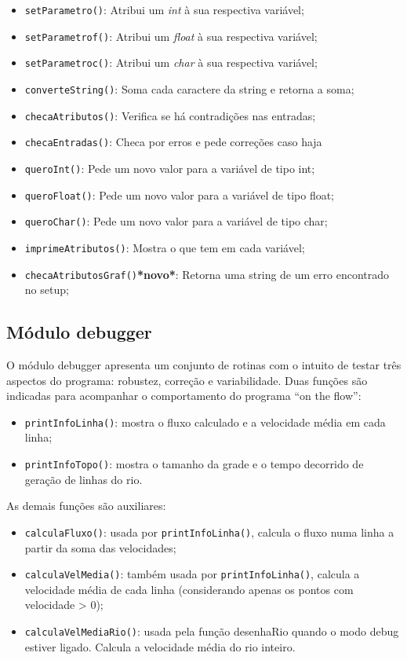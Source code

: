 \documentclass[11pt,a4paper]{article}
\begin{document}
\begin{itemize}
\item \verb|setParametro()|: Atribui um \textit{int} à sua respectiva variável;
\item \verb|setParametrof()|: Atribui um \textit{float} à sua respectiva variável;
\item \verb|setParametroc()|: Atribui um \textit{char} à sua respectiva variável;
\item \verb|converteString()|: Soma cada caractere da string e retorna a soma;
\item \verb|checaAtributos()|: Verifica se há contradições nas entradas;
\item \verb|checaEntradas()|: Checa por erros e pede correções caso haja
\item \verb|queroInt()|: Pede um novo valor para a variável de tipo int;
\item \verb|queroFloat()|: Pede um novo valor para a variável de tipo float;
\item \verb|queroChar()|: Pede um novo valor para a variável de tipo char;
\item \verb|imprimeAtributos()|: Mostra o que tem em cada variável;
\item \verb|checaAtributosGraf()|\textbf{*novo*}: Retorna uma string de um erro encontrado no setup;
\end{itemize}

\subsection{Módulo debugger}
O módulo debugger apresenta um conjunto de rotinas com o intuito de testar três aspectos do programa: robustez, correção e variabilidade. Duas funções são indicadas para acompanhar o comportamento do programa “on the flow”:

\begin{itemize}
\item \verb|printInfoLinha()|: mostra o fluxo calculado e a velocidade média em cada linha;
\item \verb|printInfoTopo()|: mostra o tamanho da grade e o tempo decorrido de geração de linhas do rio.
\end{itemize}

As demais funções são auxiliares:

\begin{itemize}
\item \verb|calculaFluxo()|: usada por \verb|printInfoLinha()|, calcula o fluxo numa linha a partir da soma das velocidades;
\item \verb|calculaVelMedia()|: também usada por \verb|printInfoLinha()|, calcula a velocidade média de cada linha (considerando apenas os pontos com velocidade > 0);
\item \verb|calculaVelMediaRio()|: usada pela função desenhaRio quando o modo debug estiver ligado. Calcula a velocidade média do rio inteiro.
\end{itemize}
\end{document}
